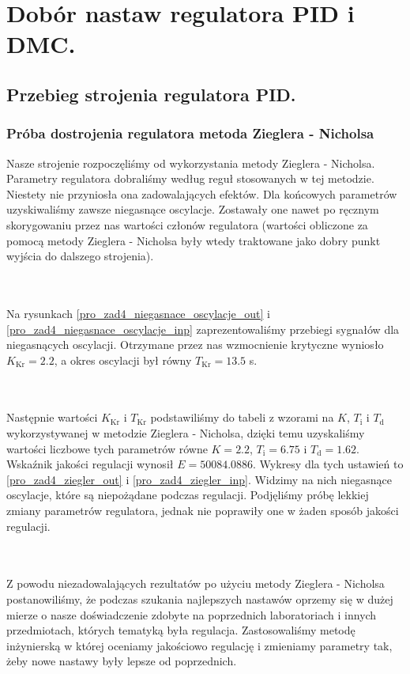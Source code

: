 \chapter{Dobór nastaw regulatora PID i DMC.}
\label{pro4_PID}

\section{Przebieg strojenia regulatora PID.}
\subsection{Próba dostrojenia regulatora metoda Zieglera - Nicholsa}
Nasze strojenie rozpoczęliśmy od wykorzystania metody Zieglera - Nicholsa. Parametry regulatora dobraliśmy według reguł stosowanych w tej metodzie. Niestety nie przyniosła ona zadowalających efektów. Dla końcowych parametrów uzyskiwaliśmy zawsze niegasnące oscylacje. Zostawały one nawet po ręcznym skorygowaniu przez nas wartości członów regulatora (wartości obliczone za pomocą metody Zieglera - Nicholsa były wtedy traktowane jako dobry punkt wyjścia do dalszego strojenia).

~\\\\Na rysunkach \ref{pro_zad4_niegasnace_oscylacje_out} i \ref{pro_zad4_niegasnace_oscylacje_inp} zaprezentowaliśmy przebiegi sygnałów dla niegasnących oscylacji. Otrzymane przez nas wzmocnienie krytyczne wyniosło $K_{\mathrm{Kr}} = 2.2$, a okres oscylacji był równy $T_{\mathrm{Kr}} = \num{13.5}$ s. 

~\\\\ Następnie wartości $K_{\mathrm{Kr}}$ i $T_{\mathrm{Kr}}$ podstawiliśmy do tabeli z wzorami na $K$, $T_{\mathrm{i}}$ i $T_{\mathrm{d}}$ wykorzystywanej w metodzie Zieglera - Nicholsa, dzięki temu uzyskaliśmy wartości liczbowe tych parametrów równe $K = \num{2.2}$, $T_{\mathrm{i}} = \num{6.75}$ i $T_{\mathrm{d}} = \num{1.62}$. Wskaźnik jakości regulacji wynosił $E = 50084.0886$. Wykresy dla tych ustawień to \ref{pro_zad4_ziegler_out} i \ref{pro_zad4_ziegler_inp}. Widzimy na nich niegasnące oscylacje, które są niepożądane podczas regulacji. Podjęliśmy próbę lekkiej zmiany parametrów regulatora, jednak nie poprawiły one w żaden sposób jakości regulacji. 

~\\\\ Z powodu niezadowalających rezultatów po użyciu metody Zieglera - Nicholsa postanowiliśmy, że podczas szukania najlepszych nastawów oprzemy się w dużej mierze o nasze doświadczenie zdobyte na poprzednich laboratoriach i innych przedmiotach, których tematyką była regulacja. Zastosowaliśmy metodę inżynierską w której oceniamy jakościowo regulację i zmieniamy parametry tak, żeby nowe nastawy były lepsze od poprzednich. 

